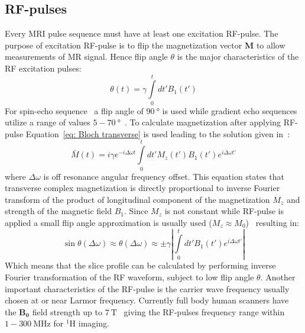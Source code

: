 \subsection{RF-pulses}
Every MRI pulse sequence must have at least one excitation RF-pulse. 
The purpose of excitation RF-pulse is to flip the magnetization vector $\mathbf{M}$ to allow measurements of MR signal. 
Hence flip angle $\theta$ is the major characteristics of the RF excitation pulses:
\begin{equation}\label{eq: Flip Angle}
\theta (t) = \gamma \int \limits_{0}^t dt' B_{1}(t')
\end{equation}
For spin-echo sequence~\cite{Hahn} a flip angle of $\SI{90}{\degree}$ is used while gradient echo sequences utilize a range of values $5-\SI{70}{\degree}$~\cite{RNDT24}.
To calculate magnetization after applying RF-pulse Equation~\ref{eq: Bloch transverse} is used leading to the solution given in~\cite{Joseph:1998fo}:
\begin{equation}\label{eq: Bloch RF solution}
	\bar{M}\left( t \right) = i \gamma e^{-i\Delta\omega t} \int\limits_{0}^t dt' M_z\left( t' \right) B_1 (t')e^{i\Delta\omega t'}
\end{equation}
where $\Delta \omega$ is off resonance angular frequency offset. 
This equation states that transverse complex magnetization is directly proportional to inverse Fourier transform of the product of longitudinal component of the magnetization $M_z$ and strength of the magnetic field $B_1$. 
Since $M_z$ is not constant while RF-pulse is applied a small flip angle approximation is usually used ($M_z \approx M_0$)~\cite{RNDT24} resulting in:
\begin{equation}\label{eq: flip angle dependency}
	\sin{\theta} (\Delta \omega) \approx \theta (\Delta \omega)  \approx \pm \gamma \left| \int\limits_{0}^t dt' B_1 (t')e^{i\Delta\omega t'} \right|
\end{equation}
Which means that the slice profile can be calculated by performing inverse Fourier transformation of the RF waveform, subject to low flip angle $\theta$. 
Another important characteristics of the RF-pulse is the carrier wave frequency usually chosen at or near Larmor frequency. 
Currently full body human scanners have the $\mathbf{B_0}$ field strength up to $\SI{7}{\tesla}$~\cite{Nowogrodzki:2018eb} giving the RF-pulses frequency range within $1 - \SI{300}{\MHz}$ for $\mathrm{^1H}$ imaging.
